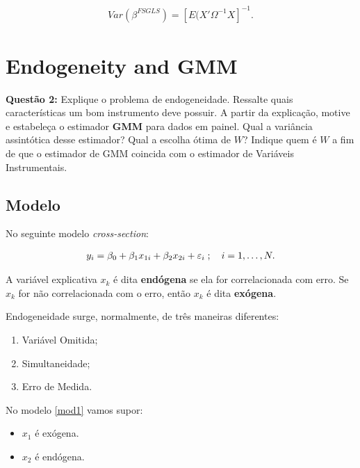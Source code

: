 \documentclass[11pt,oneside,a4paper]{article}
\numberwithin{equation}{section}
\begin{document}
\vspace{-1.5 em}
\begin{align*}
	Var(\beta^{FSGLS}) = \left[ E(X' \Omega^{-1} X \right]^{-1}.
\end{align*}

\clearpage
\section{Endogeneity and GMM}

\noindent
\textbf{Questão 2:}
Explique o problema de endogeneidade.
Ressalte quais características um bom instrumento deve possuir.
A partir da explicação, motive e estabeleça o estimador \textbf{GMM} para dados em painel.
Qual a variância assintótica desse estimador?
Qual a escolha ótima de $W$?
Indique quem é $W$ a fim de que o estimador de GMM coincida com o estimador de Variáveis Instrumentais.

\subsection*{Modelo}

No seguinte modelo \textit{cross-section}:

\vspace{-1 em}
\begin{align} \label{mod1}
	y_{i} = \beta_{0} + \beta_{1} x_{1i} + \beta_{2} x_{2i} + \varepsilon_{i}
	\; ; \quad i = 1, \dots, N.
\end{align}

\noindent
A variável explicativa $x_{k}$ é dita \textbf{endógena} se ela for correlacionada com erro.
Se $x_{k}$ for não correlacionada com o erro, então $x_{k}$ é dita \textbf{exógena}.

Endogeneidade surge, normalmente, de três maneiras diferentes:

\begin{enumerate}\itemsep0pt
	\item Variável Omitida;
	\item Simultaneidade;
	\item Erro de Medida.
\end{enumerate}

No modelo \eqref{mod1} vamos supor:

\begin{itemize}\itemsep0pt
	\item $x_{1}$ é exógena.
	\item $x_{2}$ é endógena.
\end{itemize}
\end{document}

